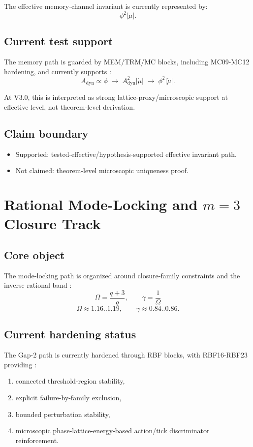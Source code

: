 \documentclass[11pt,a4paper]{article}
\begin{document}
The effective memory-channel invariant is currently represented by:
\[
\phi^2\lvert\dot{\mu}\rvert.
\]

\subsection{Current test support}

The memory path is guarded by MEM/TRM/MC blocks, including MC09-MC12 hardening, and currently supports \cite{memory_derivation,trm_memory_first_principles,geodesic_derivation,finsler_action}:
\[
A_{\mathrm{dyn}}\propto\phi
\;\rightarrow\;
A_{\mathrm{dyn}}^2\lvert\dot{\mu}\rvert
\;\rightarrow\;
\phi^2\lvert\dot{\mu}\rvert.
\]

At V3.0, this is interpreted as strong lattice-proxy/microscopic support at effective level, not theorem-level derivation.

\subsection{Claim boundary}

\begin{itemize}
  \item Supported: tested-effective/hypothesis-supported effective invariant path.
  \item Not claimed: theorem-level microscopic uniqueness proof.
\end{itemize}

\section{Rational Mode-Locking and \(m=3\) Closure Track}

\subsection{Core object}

The mode-locking path is organized around closure-family constraints and the inverse rational band \cite{collective_mode_locking,trm_rational_band_first_principles}:
\[
\Omega=\frac{q+3}{q},\qquad \gamma=\frac{1}{\Omega}
\]
\[
\Omega \approx 1.16..1.19,\qquad \gamma \approx 0.84..0.86.
\]

\subsection{Current hardening status}

The Gap-2 path is currently hardened through RBF blocks, with RBF16-RBF23 providing \cite{m3_closure_path,trm_status_v3}:
\begin{enumerate}
  \item connected threshold-region stability,
  \item explicit failure-by-family exclusion,
  \item bounded perturbation stability,
  \item microscopic phase-lattice-energy-based action/tick discriminator reinforcement.
\end{enumerate}
\end{document}
